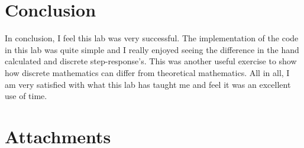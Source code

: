 \documentclass[12pt]{report}
\begin{document}
\section{Conclusion}
In conclusion, I feel this lab was very successful. The implementation of the code in this lab was quite simple and I really enjoyed seeing the difference in the 
hand calculated and discrete step-response's. This was another useful exercise to show how discrete mathematics can differ from theoretical mathematics. All in all,
I am very satisfied with what this lab has taught me and feel it was an excellent use of time.
\newpage
\thispagestyle{customblank}
\vspace*{\fill}
\centering \section{Attachments}\label{section: Attachments}
\vspace*{\fill}





\end{document}
